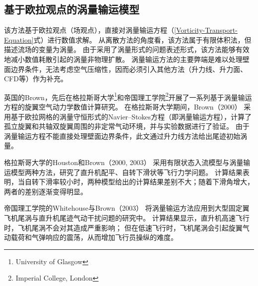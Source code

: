\documentclass[doctor,openright,twoside,color]{buaathesis}
\begin{document}
\subsection{基于欧拉观点的涡量输运模型}\label{Vorticity-Transport-Model}
该方法基于欧拉观点（场观点），直接对涡量输运方程（\ref{Vorticity-Transport-Equation}式）进行数值求解。
从离散方法的角度看，该方法属于有限体积法，但描述流场的变量为涡量。
由于采用了涡量形式的问题表述形式，该方法能够有效地减小数值耗散引起的涡量非物理扩散。
涡量输运方法的主要弊端是难以处理壁面边界条件，无法考虑空气压缩性，因而必须引入其他方法（升力线、升力面、CFD等）作为补充。

英国的Brown，先后在格拉斯哥大学\footnote{University of Glasgow}和帝国理工学院\footnote{Imperial College, London}开展了一系列基于涡量输运方程的旋翼空气动力学数值计算研究。
在格拉斯哥大学期间，Brown（2000）
采用基于欧拉网格的涡量守恒形式的Navier–Stokes方程（即涡量输运方程），计算了孤立旋翼和共轴双旋翼周围的非定常气动环境，并与实验数据进行了验证。
由于涡量输运方程不能直接处理壁面边界条件，此文通过升力线方法给出尾迹初始涡量。

格拉斯哥大学的Houston和Brown（2000, 2003）
采用有限状态入流模型与涡量输运模型两种方法，研究了直升机配平、自转下滑状等飞行力学问题。
计算结果表明，当自转下滑率较小时，两种模型给出的计算结果差别不大；随着下滑角增大，两者的差别逐渐变得明显。

帝国理工学院的Whitehouse与Brown（2003）
将涡量输运方法应用到大型固定翼飞机尾涡与直升机尾迹气动干扰问题的研究中。
计算结果显示，直升机高速飞行时，飞机尾涡不会对其造成严重影响；
但在低速飞行时，飞机尾涡会引起旋翼气动载荷和气弹响应的震荡，从而增加飞行员操纵的难度。
\end{document}
